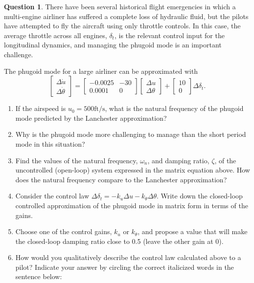 \documentclass{article}
\theoremstyle{definition}
\newtheorem{question}{Question}
\begin{document}
\begin{question}
    There have been several historical flight emergencies in which a multi-engine airliner has suffered a complete loss of hydraulic fluid, but the pilots have attempted to fly the aircraft using only throttle controls. In this case, the average throttle across all engines, $\delta_t$, is the relevant control input for the longitudinal dynamics, and managing the phugoid mode is an important challenge.

    The phugoid mode for a large airliner can be approximated with
    $$
    \begin{bmatrix}
        \Delta \dot{u} \\
        \Delta \dot{\theta}
    \end{bmatrix}
    = 
    \begin{bmatrix}
        -0.0025 & -30 \\
        0.0001 & 0
    \end{bmatrix}
    \begin{bmatrix}
        \Delta u \\
        \Delta \theta
    \end{bmatrix}
    +
    \begin{bmatrix}
        10 \\
        0
    \end{bmatrix}
    \Delta \delta_t \text{.}
    $$
    
    \begin{enumerate}[label=(\alph*)]
        \item If the airspeed is $u_0 = 500\text{ft/s}$, what is the natural frequency of the phugoid mode predicted by the Lanchester approximation?
        \item Why is the phugoid mode more challenging to manage than the short period mode in this situation?
        \item Find the values of the natural frequency, $\omega_n$, and damping ratio, $\zeta$, of the uncontrolled (open-loop) system expressed in the matrix equation above. How does the natural frequency compare to the Lanchester approximation?
        \item Consider the control law $\Delta \delta_t = -k_u \Delta u - k_\theta \Delta \theta$. Write down the closed-loop controlled approximation of the phugoid mode in matrix form in terms of the gains.
        \item Choose one of the control gains, $k_u$ or $k_\theta$, and propose a value that will make the closed-loop damping ratio close to 0.5 (leave the other gain at 0).
        \item How would you qualitatively describe the control law calculated above to a pilot? Indicate your answer by circling the correct italicized words in the sentence below:
    
    \end{enumerate}
\end{question}
\vspace{0.1cm}
\end{document}
